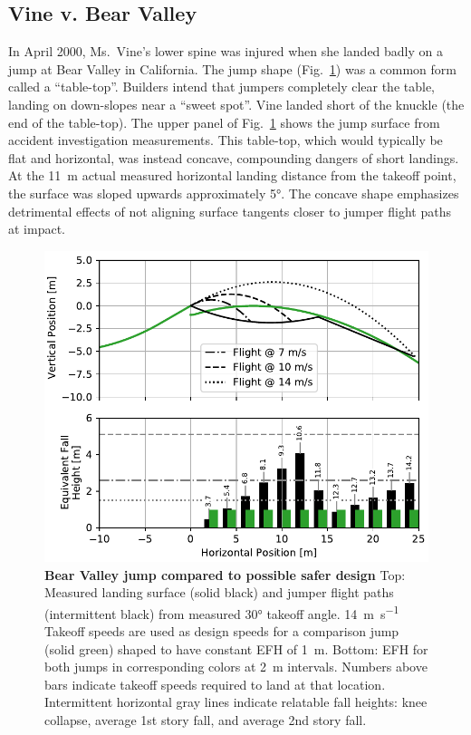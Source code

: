 \documentclass[smallextended]{svjour3}       %
\begin{document}
\subsection{Vine v. Bear Valley}
\label{sec:vine}
%
In April 2000, Ms.~Vine's lower spine was injured when she landed badly on a jump at
Bear Valley in California. The jump shape
(Fig.~\ref{fig:vine-v-bear-valley}) was a common form called a ``table-top''. Builders intend that jumpers completely clear
the table, landing on down-slopes near a ``sweet spot''.
Vine landed short of the knuckle (the end of the table-top). The upper panel of
Fig.~\ref{fig:vine-v-bear-valley} shows the jump surface from accident
investigation measurements. This table-top, which would typically be flat and
horizontal, was instead concave, compounding dangers of short landings. At
the 11~\si{\meter} actual measured horizontal landing distance from the takeoff
point, the surface was sloped upwards approximately 5\si{\degree}. The concave
shape emphasizes detrimental effects of not aligning 
surface tangents closer to jumper flight paths at impact.
%
\begin{figure}
  \centering
  \includegraphics[width=5.25in]{figures/vine-v-bear-valley.pdf}
  \caption{\textbf{Bear Valley jump compared to possible safer design}
  Top: Measured landing surface (solid black) and jumper flight paths
  (intermittent black) from measured 30\si{\degree} takeoff angle. 
  14~\si{\meter\per\second} Takeoff speeds are used as design speeds \cite{Levy2015} for a
  comparison jump (solid green) shaped to have constant EFH of 1~\si{\meter}.
  Bottom: EFH for both jumps in corresponding
  colors at 2~\si{\meter} intervals. Numbers above bars indicate
  takeoff speeds required to land at that location.
  Intermittent horizontal gray lines indicate relatable fall heights: knee
  collapse, average 1st story fall, and average 2nd story fall.
  }
  \label{fig:vine-v-bear-valley}
\end{figure}
\end{document}
